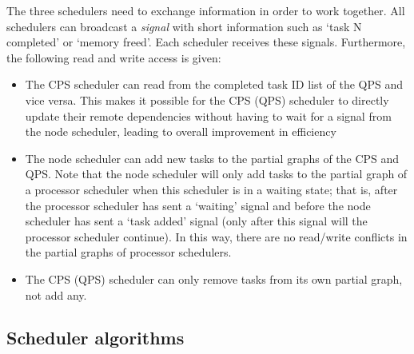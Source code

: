 The three schedulers need to exchange information in order to work together.
All schedulers can broadcast a \textit{signal} with short information such as `task N completed' or `memory freed'. Each scheduler receives these signals.
Furthermore, the following read and write access is given:
\begin{itemize}
    \item The CPS scheduler can read from the completed task ID list of the QPS and vice versa. This makes it possible for the CPS (QPS) scheduler to directly update their remote dependencies without having to wait for a signal from the node scheduler, leading to overall improvement in efficiency
    \item The node scheduler can add new tasks to the partial graphs of the CPS and QPS. Note that the node scheduler will only add tasks to the partial graph of a processor scheduler when this scheduler is in a waiting state; that is, after the processor scheduler has sent a `waiting' signal and before the node scheduler has sent a `task added' signal (only after this signal will the processor scheduler continue). In this way, there are no read/write conflicts in the partial graphs of processor schedulers.
    \item The CPS (QPS) scheduler can only remove tasks from its own partial graph, not add any.
\end{itemize}



\subsection{Scheduler algorithms}

